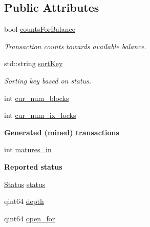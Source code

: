 \subsection*{Public Attributes}
\begin{DoxyCompactItemize}
\item 
bool \hyperlink{class_transaction_status_a052ab3e47ca113a3e921f069723b8601}{counts\+For\+Balance}
\begin{DoxyCompactList}\small\item\em Transaction counts towards available balance. \end{DoxyCompactList}\item 
std\+::string \hyperlink{class_transaction_status_afb31544f313d0630a41e376417233d68}{sort\+Key}
\begin{DoxyCompactList}\small\item\em Sorting key based on status. \end{DoxyCompactList}\item 
int \hyperlink{class_transaction_status_a22839cc23993e849a6c9fed8bffd5f50}{cur\+\_\+num\+\_\+blocks}
\item 
int \hyperlink{class_transaction_status_a5dd91f2741963d7e68990fdf5f33c2da}{cur\+\_\+num\+\_\+ix\+\_\+locks}
\end{DoxyCompactItemize}
\begin{Indent}{\bf Generated (mined) transactions}\par
\begin{DoxyCompactItemize}
\item 
int \hyperlink{class_transaction_status_a6714606658df9486e4a3f8f2be5d28b4}{matures\+\_\+in}
\end{DoxyCompactItemize}
\end{Indent}
\begin{Indent}{\bf Reported status}\par
\begin{DoxyCompactItemize}
\item 
\hyperlink{class_transaction_status_aaa6cc19ca3509bbae72d0df1661f85cb}{Status} \hyperlink{class_transaction_status_aa7d0dbec0880ccd8539d7e332f847451}{status}
\item 
qint64 \hyperlink{class_transaction_status_ac8a3bd9c1ad3969c6f969418fcffa0ca}{depth}
\item 
qint64 \hyperlink{class_transaction_status_a861ed66c0fd49440bc1aacab5315a938}{open\+\_\+for}
\end{DoxyCompactItemize}
\end{Indent}


